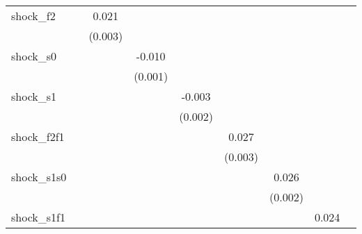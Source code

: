 {\begin{tabular}{l*{8}{c}}
\addlinespace
shock\_f2    &                     &       0.021\sym{***}&                     &                     &                     &                     &                     &                     \\
            &                     &     (0.003)         &                     &                     &                     &                     &                     &                     \\
\addlinespace
shock\_s0    &                     &                     &      -0.010\sym{***}&                     &                     &                     &                     &                     \\
            &                     &                     &     (0.001)         &                     &                     &                     &                     &                     \\
\addlinespace
shock\_s1    &                     &                     &                     &      -0.003         &                     &                     &                     &                     \\
            &                     &                     &                     &     (0.002)         &                     &                     &                     &                     \\
\addlinespace
shock\_f2f1  &                     &                     &                     &                     &       0.027\sym{***}&                     &                     &                     \\
            &                     &                     &                     &                     &     (0.003)         &                     &                     &                     \\
\addlinespace
shock\_s1s0  &                     &                     &                     &                     &                     &       0.026\sym{***}&                     &                     \\
            &                     &                     &                     &                     &                     &     (0.002)         &                     &                     \\
\addlinespace
shock\_s1f1  &                     &                     &                     &                     &                     &                     &       0.024\sym{***}&                     \\

\end{tabular}}
